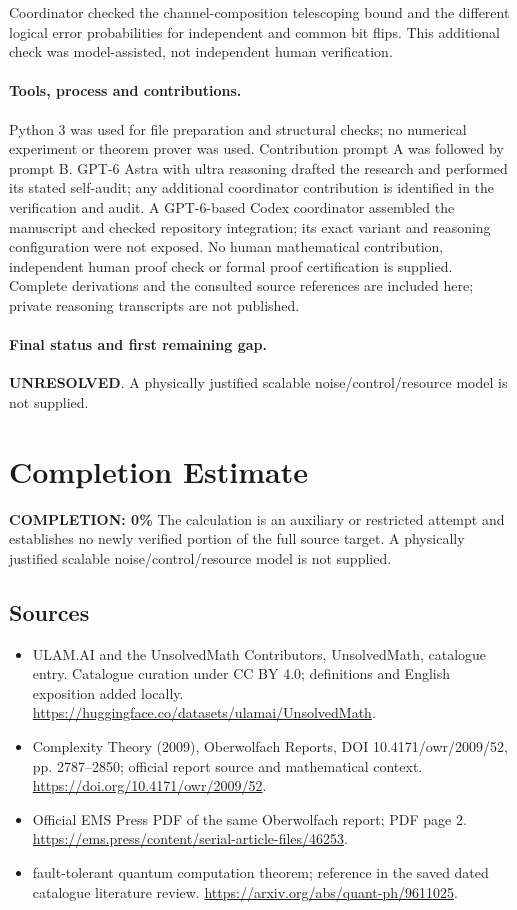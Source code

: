 \documentclass[11pt]{article}
\begin{document}
Coordinator checked the channel-composition telescoping bound and the different logical error probabilities for independent and common bit flips. This additional check was model-assisted, not independent human verification.

\paragraph{Tools, process and contributions.}
Python 3 was used for file preparation and structural checks; no numerical experiment or theorem prover was used. Contribution prompt A was followed by prompt B. GPT-6 Astra with ultra reasoning drafted the research and performed its stated self-audit; any additional coordinator contribution is identified in the verification and audit. A GPT-6-based Codex coordinator assembled the manuscript and checked repository integration; its exact variant and reasoning configuration were not exposed. No human mathematical contribution, independent human proof check or formal proof certification is supplied. Complete derivations and the consulted source references are included here; private reasoning transcripts are not published.

\paragraph{Final status and first remaining gap.}
\textbf{UNRESOLVED}. A physically justified scalable noise/control/resource model is not supplied.

\section{Completion Estimate}
\noindent\textbf{COMPLETION: 0\%}
The calculation is an auxiliary or restricted attempt and establishes no newly verified portion of the full source target. A physically justified scalable noise/control/resource model is not supplied.

\subsection{Sources}
\begin{itemize}
\item[\hypertarget{source:statement:1}{S1}] ULAM.AI and the UnsolvedMath Contributors, UnsolvedMath, catalogue entry. Catalogue curation under CC BY 4.0; definitions and English exposition added locally.
\url{https://huggingface.co/datasets/ulamai/UnsolvedMath}.
\item[\hypertarget{source:statement:2}{S2}] Complexity Theory (2009), Oberwolfach Reports, DOI 10.4171/owr/2009/52, pp. 2787--2850; official report source and mathematical context.
\url{https://doi.org/10.4171/owr/2009/52}.
\item[\hypertarget{source:statement:3}{S3}] Official EMS Press PDF of the same Oberwolfach report; PDF page 2.
\url{https://ems.press/content/serial-article-files/46253}.
\item[\hypertarget{source:statement:4}{S4}] fault-tolerant quantum computation theorem; reference in the saved dated catalogue literature review.
\url{https://arxiv.org/abs/quant-ph/9611025}.
\end{itemize}
\label{end:statement}
\end{document}
